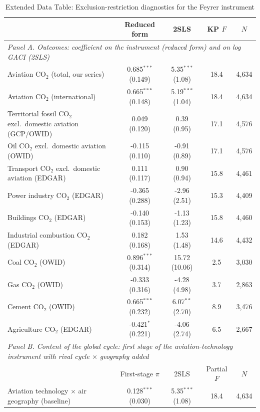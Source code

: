 \begin{table}[htbp]
\centering
\begin{threeparttable}
\caption{Extended Data Table: Exclusion-restriction diagnostics for the Feyrer instrument}
\label{tab:exclusion}
\scriptsize
\begin{tabular}{lcccc}
\toprule
 & Reduced form & 2SLS & KP $F$ & $N$ \\
\midrule
\multicolumn{5}{l}{\textit{Panel A. Outcomes: coefficient on the instrument (reduced form) and on log GACI (2SLS)}} \\
  Aviation CO$_2$ (total, our series) & 0.685$^{***}$ (0.149) & 5.35$^{***}$ (1.08) & 18.4 & 4,634 \\
  Aviation CO$_2$ (international) & 0.665$^{***}$ (0.148) & 5.19$^{***}$ (1.04) & 18.4 & 4,634 \\
  Territorial fossil CO$_2$ excl.\ domestic aviation (GCP/OWID) & 0.049 (0.120) & 0.39 (0.95) & 17.1 & 4,576 \\
  Oil CO$_2$ excl.\ domestic aviation (OWID) & -0.115 (0.110) & -0.91 (0.89) & 17.1 & 4,576 \\
  Transport CO$_2$ excl.\ domestic aviation (EDGAR) & 0.111 (0.117) & 0.90 (0.94) & 15.8 & 4,461 \\
  Power industry CO$_2$ (EDGAR) & -0.365 (0.288) & -2.96 (2.51) & 15.3 & 4,409 \\
  Buildings CO$_2$ (EDGAR) & -0.140 (0.153) & -1.13 (1.23) & 15.8 & 4,460 \\
  Industrial combustion CO$_2$ (EDGAR) & 0.182 (0.168) & 1.53 (1.48) & 14.6 & 4,432 \\
  Coal CO$_2$ (OWID) & 0.896$^{***}$ (0.314) & 15.72 (10.06) & 2.5 & 3,030 \\
  Gas CO$_2$ (OWID) & -0.333 (0.316) & -4.28 (4.98) & 3.7 & 2,863 \\
  Cement CO$_2$ (OWID) & 0.665$^{***}$ (0.232) & 6.07$^{**}$ (2.70) & 8.9 & 3,476 \\
  Agriculture CO$_2$ (EDGAR) & -0.421$^{*}$ (0.221) & -4.06 (2.74) & 6.5 & 2,667 \\
\midrule
\multicolumn{5}{l}{\textit{Panel B. Content of the global cycle: first stage of the aviation-technology instrument with rival cycle $\times$ geography added}} \\
 & First-stage $\pi$ & 2SLS & Partial $F$ & $N$ \\
  Aviation technology $\times$ air geography (baseline) & 0.128$^{***}$ (0.030) & 5.35$^{***}$ (1.08) & 18.4 & 4,634 \\

\end{tabular}
\end{threeparttable}
\end{table}
